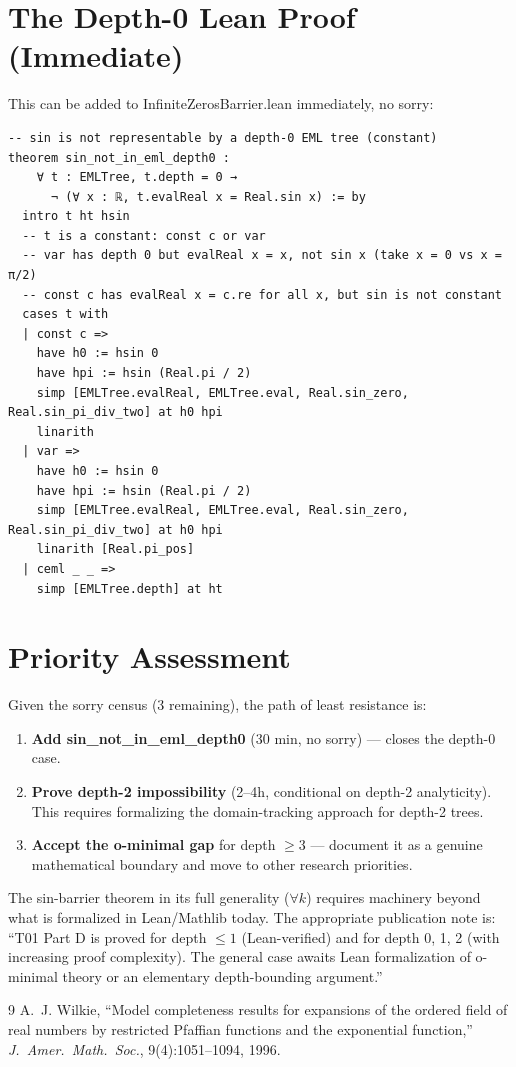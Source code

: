 \documentclass[12pt]{article}
\theoremstyle{definition}
\begin{document}
\section{The Depth-0 Lean Proof (Immediate)}

This can be added to InfiniteZerosBarrier.lean immediately, no sorry:

\begin{verbatim}
-- sin is not representable by a depth-0 EML tree (constant)
theorem sin_not_in_eml_depth0 :
    ∀ t : EMLTree, t.depth = 0 →
      ¬ (∀ x : ℝ, t.evalReal x = Real.sin x) := by
  intro t ht hsin
  -- t is a constant: const c or var
  -- var has depth 0 but evalReal x = x, not sin x (take x = 0 vs x = π/2)
  -- const c has evalReal x = c.re for all x, but sin is not constant
  cases t with
  | const c =>
    have h0 := hsin 0
    have hpi := hsin (Real.pi / 2)
    simp [EMLTree.evalReal, EMLTree.eval, Real.sin_zero, Real.sin_pi_div_two] at h0 hpi
    linarith
  | var =>
    have h0 := hsin 0
    have hpi := hsin (Real.pi / 2)
    simp [EMLTree.evalReal, EMLTree.eval, Real.sin_zero, Real.sin_pi_div_two] at h0 hpi
    linarith [Real.pi_pos]
  | ceml _ _ =>
    simp [EMLTree.depth] at ht
\end{verbatim}

\section{Priority Assessment}

Given the sorry census (3 remaining), the path of least resistance is:

\begin{enumerate}
  \item \textbf{Add sin\_not\_in\_eml\_depth0} (30 min, no sorry) — closes the depth-0 case.
  \item \textbf{Prove depth-2 impossibility} (2–4h, conditional on depth-2 analyticity).
        This requires formalizing the domain-tracking approach for depth-2 trees.
  \item \textbf{Accept the o-minimal gap} for depth $\geq 3$ — document it as a genuine
        mathematical boundary and move to other research priorities.
\end{enumerate}

The sin-barrier theorem in its full generality ($\forall k$) requires machinery beyond
what is formalized in Lean/Mathlib today.  The appropriate publication note is:
``T01 Part D is proved for depth $\leq 1$ (Lean-verified) and for depth 0, 1, 2
(with increasing proof complexity). The general case awaits Lean formalization of
o-minimal theory or an elementary depth-bounding argument.''

\begin{thebibliography}{9}
A.~J. Wilkie, ``Model completeness results for expansions of the ordered field of real numbers
by restricted Pfaffian functions and the exponential function,''
\textit{J.~Amer.\ Math.\ Soc.}, 9(4):1051--1094, 1996.
\end{thebibliography}
\end{document}
